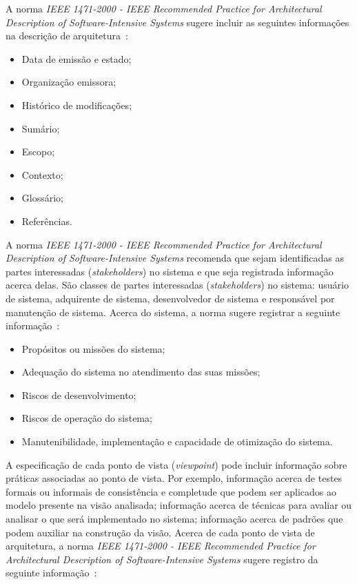 A norma \emph{IEEE 1471-2000 - IEEE Recommended Practice for Architectural Description of Software-Intensive Systems} sugere incluir as seguintes informações na descrição de arquitetura~\cite{ISO_1471}: 

\begin{itemize}
    \item Data de emissão e estado;
    \item Organização emissora;
    \item Histórico de modificações;
    \item Sumário;
    \item Escopo;
    \item Contexto;
    \item Glossário;
    \item Referências.

\end{itemize}

A norma \emph{IEEE 1471-2000 - IEEE Recommended Practice for Architectural Description of Software-Intensive Systems} recomenda que sejam identificadas as partes interessadas (\emph{stakeholders}) no sistema e que seja registrada informação acerca delas. São classes de partes interessadas (\emph{stakeholders}) no sistema: usuário de sistema, adquirente de sistema, desenvolvedor de sistema e responsável por manutenção de sistema. Acerca do sistema, a norma sugere registrar a seguinte informação~\cite{ISO_1471}: 

\begin{itemize}
    \item Propósitos ou missões do sistema;
    \item Adequação do sistema no atendimento das suas missões;
    \item  Riscos de desenvolvimento;
    \item  Riscos de operação do sistema;
    \item Manutenibilidade, implementação e capacidade de otimização do sistema.

\end{itemize}

A especificação de cada ponto de vista (\emph{viewpoint}) pode incluir informação sobre práticas associadas ao ponto de vista. Por exemplo, informação acerca de testes formais ou informais de consistência e completude que podem ser aplicados ao modelo presente na visão analisada; informação acerca de técnicas para avaliar ou analisar o que será implementado no sistema; informação acerca de padrões que podem auxiliar na construção da visão. Acerca de cada ponto de vista de arquitetura, a norma \emph{IEEE 1471-2000 - IEEE Recommended Practice for Architectural Description of Software-Intensive Systems} sugere registro da seguinte informação~\cite{ISO_1471}:

